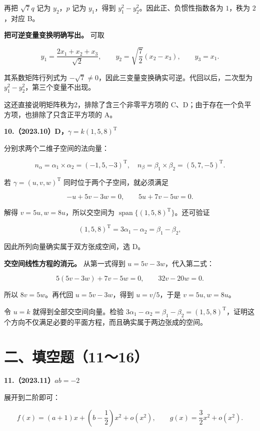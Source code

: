 \documentclass[UTF8,11pt,fontset=windows]{ctexart}
\begin{document}
再把 $\sqrt7q$ 记为 $y_2$，$p$ 记为 $y_1$，得到 $y_1^2-y_2^2$。因此正、负惯性指数各为 $1$，秩为 $2$，对应 B。

\textbf{把可逆变量变换明确写出。} 可取

$$
y_1=\frac{2x_1+x_2+x_3}{\sqrt2},\qquad
 y_2=\sqrt{\frac72}(x_2-x_3),\qquad y_3=x_1.
$$

其系数矩阵行列式为 $-\sqrt7\ne0$，因此三变量变换确实可逆。代回以后，二次型为 $y_1^2-y_2^2$，第三个变量不出现。

这还直接说明矩阵秩为2，排除了含三个非零平方项的 C、D；由于存在一个负平方项，也排除了只含正平方项的 A。

\clearpage

\textbf{10.（2023.10）D，$\gamma=k(1,5,8)^{\mathrm T}$}

分别求两个二维子空间的法向量：

$$
n_\alpha=\alpha_1\times\alpha_2=(-1,5,-3)^{\mathrm T},\quad
n_\beta=\beta_1\times\beta_2=(5,7,-5)^{\mathrm T}.
$$

若 $\gamma=(u,v,w)^{\mathrm T}$ 同时位于两个子空间，就必须满足

$$
-u+5v-3w=0,\qquad 5u+7v-5w=0.
$$

解得 $v=5u,w=8u$，所以交空间为 $\operatorname{span}\{(1,5,8)^{\mathrm T}\}$。还可验证

$$
(1,5,8)^{\mathrm T}=3\alpha_1-\alpha_2=\beta_1-\beta_2,
$$

因此所列向量确实属于双方张成空间，选 D。

\textbf{交空间线性方程的消元。} 从第一式得到 $u=5v-3w$，代入第二式：

$$
5(5v-3w)+7v-5w=0,
\qquad32v-20w=0.
$$

所以 $8v=5w$。再代回 $u=5v-3w$，得到 $u=v/5$，于是 $v=5u,w=8u$。

令 $u=k$ 就得到全部交空间向量。检验 $3\alpha_1-\alpha_2=\beta_1-\beta_2=(1,5,8)^{\mathrm T}$，证明这个方向不仅满足必要的平面方程，而且确实属于两边张成的空间。

\clearpage

\section*{二、填空题（11～16）}

\textbf{11.（2023.11）$ab=-2$}

展开到二阶即可：

$$
f(x)=(a+1)x+\left(b-\frac12\right)x^2+o(x^2),\qquad
g(x)=\frac32x^2+o(x^2).
$$
\end{document}
